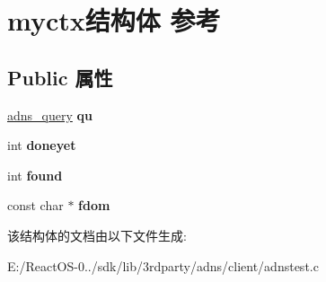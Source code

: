 \hypertarget{structmyctx}{}\section{myctx结构体 参考}
\label{structmyctx}
\subsection*{Public 属性}
\begin{DoxyCompactItemize}
\item 
\mbox{\label{structmyctx_a7c30ef1bf28087b5a1a732b807559c74}} 
\hyperlink{structadns____query}{adns\+\_\+query} {\bfseries qu}
\item 
\mbox{\label{structmyctx_a92c4028fd679c948104e9d52136506bf}} 
int {\bfseries doneyet}
\item 
\mbox{\label{structmyctx_a96f40aa0323c2bc1260719434efe322b}} 
int {\bfseries found}
\item 
\mbox{\label{structmyctx_a7a29c9ef459bf8f08cce4fd8b822353f}} 
const char $\ast$ {\bfseries fdom}
\end{DoxyCompactItemize}


该结构体的文档由以下文件生成\+:\begin{DoxyCompactItemize}
\item 
E\+:/\+React\+O\+S-\/0../sdk/lib/3rdparty/adns/client/adnstest.\+c\end{DoxyCompactItemize}

